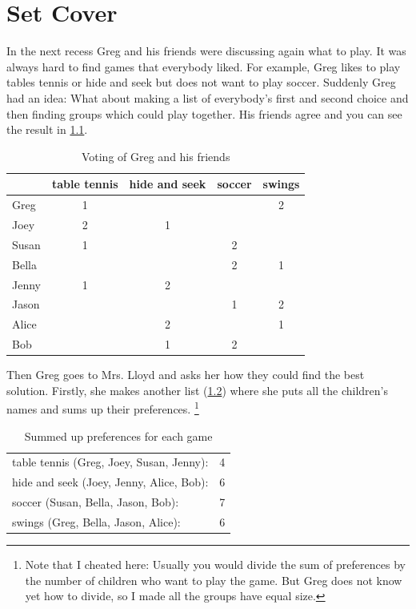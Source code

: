\chapter{Set Cover}
In the next recess Greg and his friends were discussing again what
to play. It was always hard to find games that everybody liked.
For example, Greg likes to play tables tennis or hide and seek but
does not want to play soccer. Suddenly Greg had an idea: What about
making a list of everybody's first and second choice and then 
finding groups which could play together. His friends agree and
you can see the result in \cref{tab:game_voting}.

\begin{table}[ht]
  \centering
  \begin{tabular}{l|cccc}
    & table tennis & hide and seek & soccer & swings \\
    \hline
    Greg  & 1 &   &   & 2 \\
    Joey  & 2 & 1 &   &   \\
    Susan & 1 &   & 2 &   \\
    Bella &   &   & 2 & 1 \\
    Jenny & 1 & 2 &   &   \\
    Jason &   &   & 1 & 2 \\
    Alice &   & 2 &   & 1 \\
    Bob   &   & 1 & 2 &   \\
  \end{tabular}
  \caption{\label{tab:game_voting}Voting of Greg and his friends}
\end{table}

Then Greg goes to Mrs. Lloyd and asks her how they could find the 
best solution. Firstly, she makes another list
(\cref{tab:example_set_cover}) where she puts all the children's
names and sums up their preferences.
\footnote{Note that I cheated here: Usually you would divide the
sum of preferences by the number of children who want to play the
game. But Greg does not know yet how to divide, so I made all the
groups have equal size.}

\begin{table}[ht]
  \centering
  \begin{tabular}{lc}
    table tennis (Greg, Joey, Susan, Jenny): & 4 \\
    hide and seek (Joey, Jenny, Alice, Bob): & 6 \\
    soccer (Susan, Bella, Jason, Bob):       & 7 \\
    swings (Greg, Bella, Jason, Alice):      & 6 \\
  \end{tabular}
  \caption{\label{tab:example_set_cover}Summed up preferences for each game}
\end{table}

